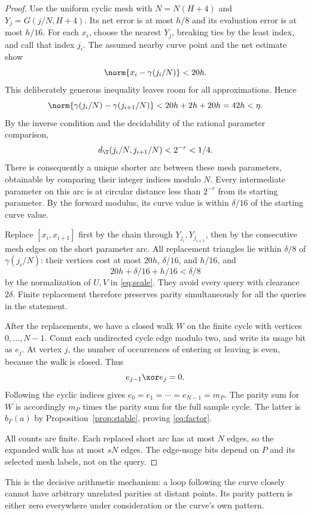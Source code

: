 \begin{proof}
Use the uniform cyclic mesh with $N=N(H+4)$ and
$Y_j=G(j/N,H+4)$. Its net error is at most $h/8$ and its evaluation
error is at most $h/16$. For each $x_i$, choose the nearest $Y_j$,
breaking ties by the least index, and call that index $j_i$.
The assumed nearby curve point and the net estimate show
\[
 \norm{x_i-\gamma(j_i/N)}<20h.
\]
This deliberately generous inequality leaves room for all
approximations. Hence
\begin{equation}
 \norm{\gamma(j_i/N)-\gamma(j_{i+1}/N)}
        <20h+2h+20h=42h<\eta.
 \label{eq:42h}
\end{equation}
By the inverse condition and the decidability of the rational parameter
comparison,
\[
 d_\T(j_i/N,j_{i+1}/N)<2^{-r}<1/4.
\]
There is consequently a unique shorter arc between these mesh
parameters, obtainable by comparing their integer indices modulo $N$.
Every intermediate parameter on this arc is at circular distance
less than $2^{-r}$ from its starting parameter. By the forward modulus,
its curve value is within $\delta/16$ of the starting curve value.

Replace $[x_i,x_{i+1}]$ first by the chain through
$Y_{j_i},Y_{j_{i+1}}$, then by the consecutive mesh edges on the
short parameter arc. All replacement triangles lie within
$\delta/8$ of $\gamma(j_i/N)$: their vertices cost at most
$20h$, $\delta/16$, and $h/16$, and
\[
             20h+\delta/16+h/16<\delta/8
\]
by the normalization of $U,V$ in \eqref{eq:scale}.
They avoid every query with clearance $2\delta$.
Finite replacement therefore preserves parity simultaneously for
all the queries in the statement.

After the replacements, we have a closed walk $W$ on the finite
cycle with vertices $0,\ldots,N-1$. Count each undirected cycle edge
modulo two, and write its usage bit as $e_j$. At vertex $j$,
the number of occurrences of entering or leaving is even, because
the walk is closed. Thus
\[
                  e_{j-1}\xor e_j=0.
\]
Following the cyclic indices gives $e_0=e_1=\cdots=e_{N-1}=m_P$.
The parity sum for $W$ is accordingly $m_P$ times the parity sum
for the full sample cycle. The latter is $b_\Gamma(a)$ by
Proposition~\ref{prop:stable}, proving \eqref{eq:factor}.

All counts are finite. Each replaced short arc has at most $N$
edges, so the expanded walk has at most $sN$ edges. The edge-usage
bits depend on $P$ and its selected mesh labels, not on the query.
\end{proof}

This is the decisive arithmetic mechanism: a loop following the curve
closely cannot have arbitrary unrelated parities at distant points.
Its parity pattern is either zero everywhere under consideration or
the curve's own pattern.
